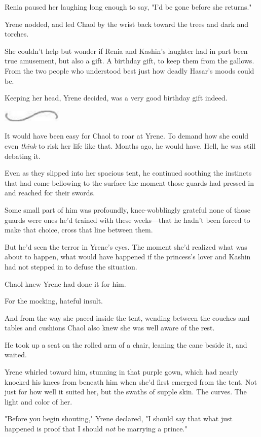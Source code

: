 Renia paused her laughing long enough to say, "I'd be gone before she returns."

Yrene nodded, and led Chaol by the wrist back toward the trees and dark and torches.

She couldn't help but wonder if Renia and Kashin's laughter had in part been true amusement, but also a gift. A birthday gift, to keep them from the gallows. From the two people who understood best just how deadly Hasar's moods could be.

Keeping her head, Yrene decided, was a very good birthday gift indeed.

\includegraphics[width=1.12in,height=0.24in]{images/seperator}

It would have been easy for Chaol to roar at Yrene. To demand how she could even \emph{think} to risk her life like that. Months ago, he would have. Hell, he was still debating it.

Even as they slipped into her spacious tent, he continued soothing the instincts that had come bellowing to the surface the moment those guards had pressed in and reached for their swords.

Some small part of him was profoundly, knee-wobblingly grateful none of those guards were ones he'd trained with these weeks---that he hadn't been forced to make that choice, cross that line between them.

But he'd seen the terror in Yrene's eyes. The moment she'd realized what was about to happen, what would have happened if the princess's lover and Kashin had not stepped in to defuse the situation.

Chaol knew Yrene had done it for him.

For the mocking, hateful insult.

And from the way she paced inside the tent, wending between the couches and tables and cushions  Chaol also knew she was well aware of the rest.

He took up a seat on the rolled arm of a chair, leaning the cane beside it, and waited.

Yrene whirled toward him, stunning in that purple gown, which had nearly knocked his knees from beneath him when she'd first emerged from the tent. Not just for how well it suited her, but the swaths of supple skin. The curves. The light and color of her.

"Before you begin shouting," Yrene declared, "I should say that what just happened is proof that I should \emph{not} be marrying a prince."

